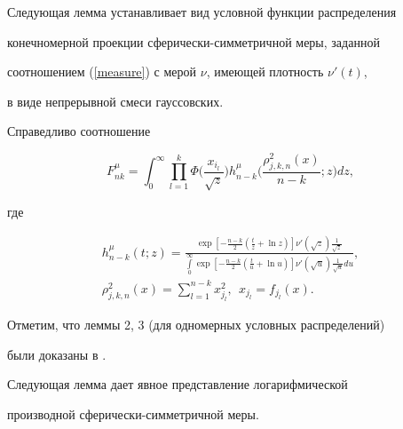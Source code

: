 Следующая лемма устанавливает вид условной функции распределения 


конечномерной проекции сферически-симметричной меры, заданной 


соотношением (\ref{measure}) с мерой $\nu$, имеющей плотность $\nu'(t)$,


в виде непрерывной смеси гауссовских.








\begin{lem}


Справедливо соотношение


\begin{equation}


F^\mu_{nk}=\int_0^\infty\prod_{l=1}^k\Phi\bigg(\frac{x_{i_l}}{\sqrt{z}}\bigg)


h_{n-k}^\mu\bigg(\frac{\rho^2_{j,k,n}(x)}{n-k};z\bigg)dz,


\label{condfr}


\end{equation}


где


\begin{gather}


h_{n-k}^\mu(t;z)=\frac{\exp[-\frac{n-k}2(\frac tz+\ln z)]


\nu'(\sqrt{z})\frac1{\sqrt{z}}}{\int\limits_0^\infty


\exp[-\frac{n-k}2(\frac tu+\ln u)]\nu'(\sqrt{u})\frac1{\sqrt{u}}du},


\label{abouth}


\\


\rho^2_{j,k,n}(x)=\sum_{l=1}^{n-k}x^2_{j_l},\ \ x_{j_l}=f_{j_l}(x).


\label{ro}


\end{gather}


\end{lem}





Отметим, что леммы 2, 3 (для одномерных условных распределений) 


были доказаны в \cite{Shats}.





Следующая лемма \cite{Norin} дает явное представление логарифмической 


производной сфе\-ри\-чес\-ки-симметричной меры.








